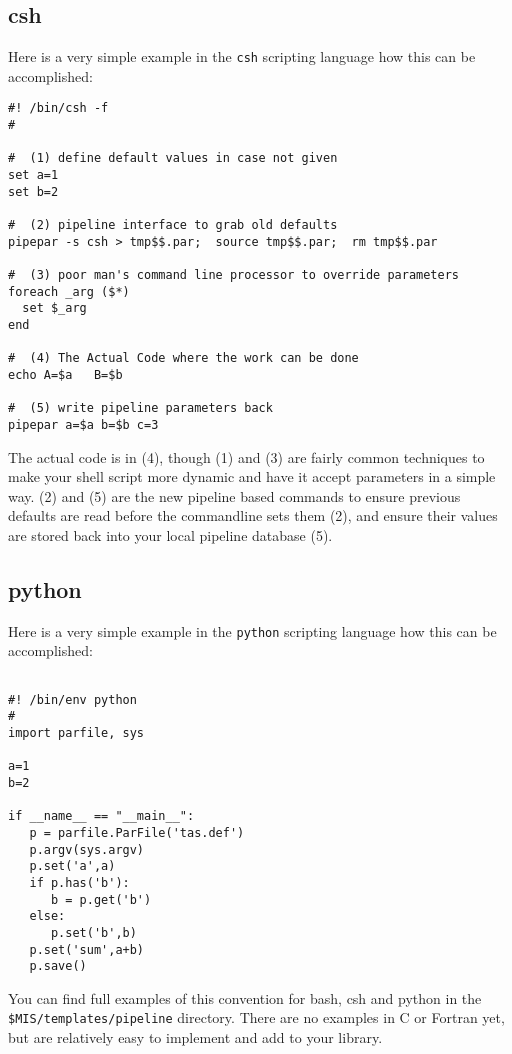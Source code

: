 \documentclass[preprint]{aastex} %
\begin{document}
\subsection{csh}
Here is a very simple example in the {\tt csh} scripting language how
this can be accomplished:

\footnotesize
\begin{verbatim}
#! /bin/csh -f
#

#  (1) define default values in case not given
set a=1
set b=2

#  (2) pipeline interface to grab old defaults
pipepar -s csh > tmp$$.par;  source tmp$$.par;  rm tmp$$.par

#  (3) poor man's command line processor to override parameters
foreach _arg ($*)
  set $_arg
end

#  (4) The Actual Code where the work can be done
echo A=$a   B=$b

#  (5) write pipeline parameters back
pipepar a=$a b=$b c=3
\end{verbatim}
\normalsize   

The actual code is in (4), though (1) and (3) are fairly common techniques
to make your shell script more dynamic and have it accept parameters in
a simple way. (2) and (5) are the new pipeline based commands to ensure
previous defaults are read before the commandline sets them (2), and 
ensure their values are stored back into your local pipeline database (5).

\subsection{python}
Here is a very simple example in the {\tt python} scripting language how
this can be accomplished:

\footnotesize
\begin{verbatim}

#! /bin/env python
#
import parfile, sys

a=1
b=2

if __name__ == "__main__":
   p = parfile.ParFile('tas.def')
   p.argv(sys.argv)
   p.set('a',a)
   if p.has('b'): 
      b = p.get('b')
   else:
      p.set('b',b)
   p.set('sum',a+b)
   p.save()
\end{verbatim}
\normalsize   

You can find full examples of this convention for
bash, csh and python in the {\tt \$MIS/templates/pipeline}
directory. There are no examples in C or Fortran yet, but
are relatively easy to implement and add to your library.
\end{document}

